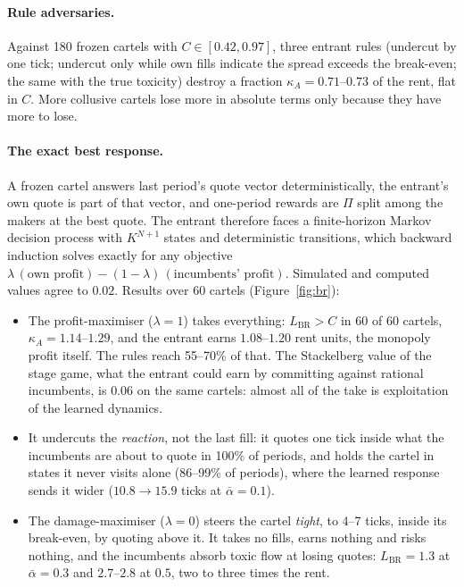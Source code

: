 \documentclass[11pt]{article}
\newcommand{\LBR}{L_{\mathrm{BR}}}
\begin{document}
\paragraph{Rule adversaries.} Against 180 frozen cartels with $C\in[0.42,0.97]$, three entrant rules (undercut by one tick; undercut only while own fills indicate the spread exceeds the break-even; the same with the true toxicity) destroy a fraction $\kappa_A=0.71$--$0.73$ of the rent, flat in $C$. More collusive cartels lose more in absolute terms only because they have more to lose.

\paragraph{The exact best response.} A frozen cartel answers last period's quote vector deterministically, the entrant's own quote is part of that vector, and one-period rewards are $\Pi$ split among the makers at the best quote. The entrant therefore faces a finite-horizon Markov decision process with $K^{N+1}$ states and deterministic transitions, which backward induction solves exactly for any objective $\lambda\,(\text{own profit})-(1-\lambda)\,(\text{incumbents' profit})$. Simulated and computed values agree to $0.02$. Results over 60 cartels (Figure~\ref{fig:br}):
\begin{itemize}
\item The profit-maximiser ($\lambda=1$) takes everything: $\LBR>C$ in 60 of 60 cartels, $\kappa_A=1.14$--$1.29$, and the entrant earns $1.08$--$1.20$ rent units, the monopoly profit itself. The rules reach 55--70\% of that. The Stackelberg value of the stage game, what the entrant could earn by committing against rational incumbents, is $0.06$ on the same cartels: almost all of the take is exploitation of the learned dynamics.
\item It undercuts the \emph{reaction}, not the last fill: it quotes one tick inside what the incumbents are about to quote in 100\% of periods, and holds the cartel in states it never visits alone (86--99\% of periods), where the learned response sends it wider ($10.8\to15.9$ ticks at $\bar\alpha=0.1$).
\item The damage-maximiser ($\lambda=0$) steers the cartel \emph{tight}, to 4--7 ticks, inside its break-even, by quoting above it. It takes no fills, earns nothing and risks nothing, and the incumbents absorb toxic flow at losing quotes: $\LBR=1.3$ at $\bar\alpha=0.3$ and $2.7$--$2.8$ at $0.5$, two to three times the rent.
\end{itemize}
\end{document}
